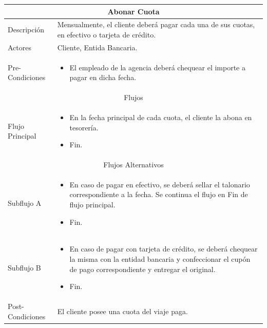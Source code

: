 \documentclass[12pt,a4paper]{article}
\newenvironment{myitemize}
{\begin{itemize}[leftmargin=*,noitemsep,topsep=0pt]}{\end{itemize}}
\newenvironment{caseuse}
{\begin{center}\begin{tabular}{|l|p{10cm}|}}{\end{tabular}\end{center}}
\begin{document}
			\begin{caseuse}
				\hline
				\multicolumn{2}{|c|}{Abonar Cuota} \\ \hline

				Descripción & Mensualmente, el cliente deberá pagar cada una de sus cuotas, en efectivo o tarjeta de crédito. \\ \hline

				Actores & Cliente, Entida Bancaria. \\ \hline

				Pre-Condiciones &
					\begin{myitemize}
						\item El empleado de la agencia deberá chequear el importe a pagar en dicha fecha.
					\end{myitemize}\\ \hline

				\multicolumn{2}{|c|}{Flujos} \\ \hline

				Flujo Principal &
					\begin{myitemize}
						\item En la fecha principal de cada cuota, el cliente la abona en tesorería.
						\item Fin.
					\end{myitemize} \\ \hline

				\multicolumn{2}{|c|}{Flujos Alternativos} \\ \hline

				Subflujo A & 
					\begin{myitemize}
						\item En caso de pagar en efectivo, se deberá sellar el talonario correspondiente a la fecha. Se continua el flujo en Fin de flujo principal.
						\item Fin.
					\end{myitemize} \\ \hline

				Subflujo B &
					\begin{myitemize}
						\item En caso de pagar con tarjeta de crédito, se deberá chequear la misma con la entidad bancaria y confeccionar el cupón de pago correspondiente y entregar el original.
						\item Fin.
					\end{myitemize} \\ \hline

				Post-Condiciones & El cliente posee una cuota del viaje paga.\\ \hline
			\end{caseuse}
\end{document}
